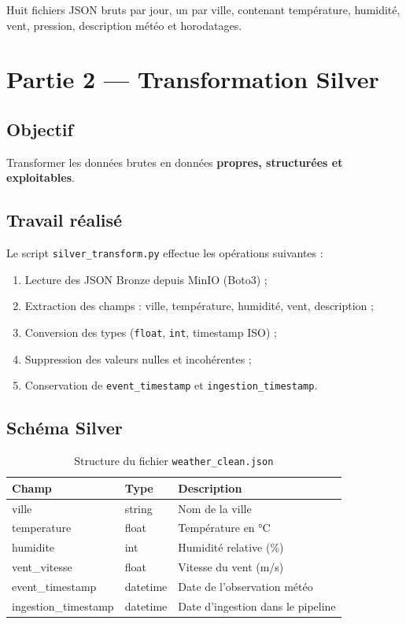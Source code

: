 \documentclass[12pt,a4paper]{report}
\begin{document}
Huit fichiers JSON bruts par jour, un par ville, contenant température, humidité, vent, pression, description météo et horodatages.

\chapter{Partie 2 — Transformation Silver}

\section{Objectif}

Transformer les données brutes en données \textbf{propres, structurées et exploitables}.

\section{Travail réalisé}

Le script \texttt{silver\_transform.py} effectue les opérations suivantes :

\begin{enumerate}[leftmargin=1.5cm]
    \item Lecture des JSON Bronze depuis MinIO (Boto3) ;
    \item Extraction des champs : ville, température, humidité, vent, description ;
    \item Conversion des types (\texttt{float}, \texttt{int}, timestamp ISO) ;
    \item Suppression des valeurs nulles et incohérentes ;
    \item Conservation de \texttt{event\_timestamp} et \texttt{ingestion\_timestamp}.
\end{enumerate}

\section{Schéma Silver}

\begin{table}[H]
\centering
\caption{Structure du fichier \texttt{weather\_clean.json}}
\begin{tabular}{@{}lll@{}}
\toprule
\textbf{Champ} & \textbf{Type} & \textbf{Description} \\
\midrule
ville & string & Nom de la ville \\
temperature & float & Température en °C \\
humidite & int & Humidité relative (\%) \\
vent\_vitesse & float & Vitesse du vent (m/s) \\
event\_timestamp & datetime & Date de l'observation météo \\
ingestion\_timestamp & datetime & Date d'ingestion dans le pipeline \\
\bottomrule
\end{tabular}
\end{table}
\end{document}
